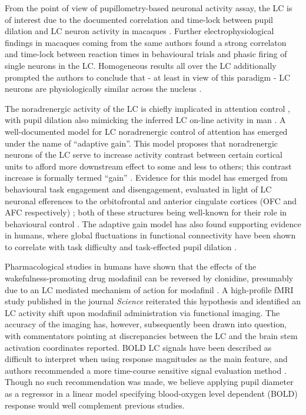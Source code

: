 	From the point of view of pupillometry-based neuronal activity assay, the LC is of interest due to the documented correlation and time-lock between pupil dilation and LC neuron activity in macaques \citep{Rajkowski1994}.
	Further electrophysiological findings in macaques coming from the same authors \citep{Rajkowski2004} found a strong correlaton and time-lock between reaction times in behavioural trials and phasic firing of single neurons in the LC.
	Homogeneous results all over the LC additionally prompted the authors to conclude that - at least in view of this paradigm - LC neurons are physiologically similar across the nucleus \citep{Rajkowski2004}.
	
	The noradrenergic activity of the LC is chiefly implicated in attention control \citep{Aston-Jones1994,Gabay2011}, with pupil dilation also mimicking the inferred LC on-line activity in man \citep{Gabay2011}.
	A well-documented model for LC noradrenergic control of attention has emerged under the name of “adaptive gain”.
	This model proposes that noradrenergic neurons of the LC serve to increase activity contrast between certain cortical units to afford more downstream effect to some and less to others; this contrast increase is formally termed “gain”  \citep{Aston-Jones2005}.
	Evidence for this model has emerged from behavioural task engagement and disengagement, evaluated in light of LC neuronal efferences to the orbitofrontal and anterior cingulate cortices (OFC and AFC respectively) \citep{Aston-Jones2005}; both of these structures being well-known for their role in behavioural control \citep{Baxter2013,Kerns2004}.
	The adaptive gain model has also found supporting evidence in humans, where global fluctuations in functional connectivity have been shown to correlate with task difficulty and task-effected pupil dilation \citep{Eldar2013}.
	
	Pharmacological studies in humans have shown that the effects of the wakefulness-promoting drug \citep{Engber1998} modafinil can be reversed by clonidine, presumably due to an LC mediated mechanism of action for modafinil \citep{Hou2005}.
	A high-profile fMRI study published in the journal \textit{Science} reiterated this hypothesis and identified an LC activity shift upon modafinil administration via functional imaging.
	The accuracy of the imaging has, however, subsequently been drawn into question, with commentators \citep{Astafiev2010} pointing at discrepancies between the LC and the brain stem activation coordinates reported.  
	BOLD LC signals have been described as difficult to interpret when using response magnitudes as the main feature, and authors recommended a more time-course sensitive signal evaluation method \citep{Astafiev2010}.
	Though no such recommendation was made, we believe applying pupil diameter as a regressor in a linear model specifying blood-oxygen level dependent (BOLD) response would well complement previous studies. 


